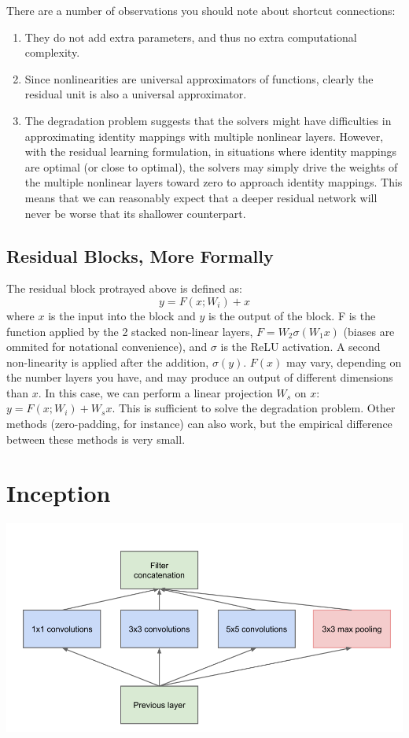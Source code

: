 \documentclass{article}
\begin{document}
There are a number of observations you should note about shortcut connections:
\begin{enumerate}
    	\item They do not add extra parameters, and thus no extra computational complexity.
    	\item Since nonlinearities are universal approximators of functions, clearly the residual unit is also a universal approximator.
	\item The degradation problem suggests that the solvers might have difficulties in approximating identity mappings with multiple nonlinear layers. However, with the residual learning formulation, in situations where identity mappings are optimal (or close to optimal), the solvers may simply drive the weights of the multiple nonlinear layers toward zero to approach identity mappings. This means that we can reasonably expect that a deeper residual network will never be worse that its shallower counterpart.
\end{enumerate}

\subsection{Residual Blocks, More Formally}
The residual block protrayed above is defined as:
$$ y = F(x; W_i) + x$$
where $x$ is the input into the block and $y$ is the output of the block. F is the function applied by the 2 stacked non-linear layers, $ F = W_2 \sigma(W_1 x) $ (biases are ommited for notational convenience), and $\sigma$ is the ReLU activation. A second non-linearity is applied after the addition, $\sigma(y)$. $F(x)$ may vary, depending on the number layers you have, and may produce an output of different dimensions than $x$. In this case, we can perform a linear projection $W_s$ on $x$: $ y = F(x; W_i) + W_s x$. This is sufficient to solve the degradation problem. Other methods (zero-padding, for instance) can also work, but the empirical difference between these methods is very small.

\section{Inception}
\begin{center}
\includegraphics[scale=0.5]{inception}
\end{center}
\end{document}
